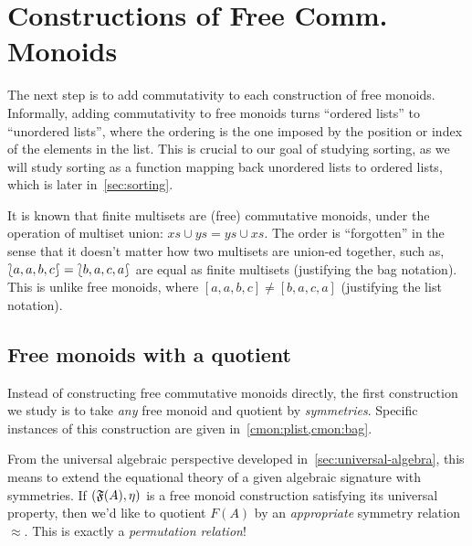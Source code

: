 
\section{Constructions of Free Comm. Monoids}
\label{sec:commutative-monoids}

The next step is to add commutativity to each construction of free monoids.
%
Informally, adding commutativity to free monoids turns ``ordered lists'' to ``unordered lists'',
where the ordering is the one imposed by the position or index of the elements in the list.
%
This is crucial to our goal of studying sorting,
as we will study sorting as a function mapping back unordered lists to ordered lists,
which is later in~\cref{sec:sorting}.

It is known that finite multisets are (free) commutative monoids,
under the operation of multiset union: $xs \cup ys = ys \cup xs$.
%
The order is ``forgotten'' in the sense that it doesn't matter how two multisets are union-ed together,
such as, ${\lbag}{a, a, b, c}{\rbag} = {\lbag}{b, a, c, a}{\rbag}$ are equal as finite multisets
(justifying the bag notation).
%
This is unlike free monoids,
where $[a, a, b, c] \neq [b, a, c, a]$ (justifying the list notation).

\subsection{Free monoids with a quotient}\label{cmon:qfreemon}

Instead of constructing free commutative monoids directly,
the first construction we study is to take \emph{any} free monoid and quotient by \emph{symmetries}.
%
Specific instances of this construction are given in~\cref{cmon:plist,cmon:bag}.

From the universal algebraic perspective developed in~\cref{sec:universal-algebra},
this means to extend the equational theory of a given algebraic signature with symmetries.
%
If $(\mathfrak{F}(A), \eta)$ is a free monoid construction satisfying its universal property,
then we'd like to quotient $F(A)$ by an \emph{appropriate} symmetry relation $\approx$.
%
This is exactly a \emph{permutation relation}!



